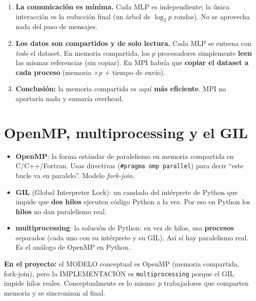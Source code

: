 \documentclass[11pt,a4paper]{article}
\newcommand{\term}[1]{\textbf{\textcolor{clave}{#1}}}
\begin{document}
\begin{importante}[title=\textbf{¿Por qué memoria compartida y no MPI?}]
\begin{enumerate}
  \item \textbf{La comunicación es mínima.} Cada MLP es independiente; la única
        interacción es la reducción final (un árbol de $\log_2 p$ rondas). No se
        aprovecha nada del paso de mensajes.
  \item \textbf{Los datos son compartidos y de solo lectura.} Cada MLP se entrena
        con \emph{todo} el dataset. En memoria compartida, los $p$ procesadores
        simplemente \textbf{leen} las mismas referencias (sin copiar). En MPI
        habría que \textbf{copiar el dataset a cada proceso} (memoria $\times p$ +
        tiempo de envío).
  \item \textbf{Conclusión:} la memoria compartida es aquí \textbf{más
        eficiente}. MPI no aportaría nada y sumaría overhead.
\end{enumerate}
\end{importante}

\section{OpenMP, multiprocessing y el GIL}

\begin{itemize}
  \item \term{OpenMP}: la forma estándar de paralelismo en memoria compartida en
        C/C++/Fortran. Usas directivas (\texttt{\#pragma omp parallel}) para
        decir ``este bucle va en paralelo''. Modelo \emph{fork-join}.
  \item \term{GIL} (Global Interpreter Lock): un candado del intérprete de Python
        que impide que \textbf{dos hilos} ejecuten código Python a la vez. Por
        eso en Python los \textbf{hilos} no dan paralelismo real.
  \item \term{multiprocessing}: la solución de Python: en vez de hilos, usa
        \textbf{procesos} separados (cada uno con su intérprete y su GIL). Así sí
        hay paralelismo real. Es el análogo de OpenMP en Python.
\end{itemize}

\textbf{En el proyecto:} el MODELO conceptual es OpenMP (memoria compartida,
fork-join), pero la IMPLEMENTACIÓN es \texttt{multiprocessing} porque el GIL
impide hilos reales. Conceptualmente es lo mismo: $p$ trabajadores que comparten
memoria y se sincronizan al final.
\end{document}
